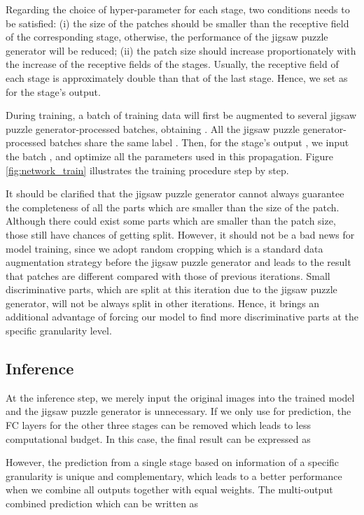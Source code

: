 \documentclass{llncs}
\begin{document}
Regarding the choice of hyper-parameter  for each stage, two conditions needs to be satisfied: (i) the size of the patches should be smaller than the receptive field of the corresponding stage, otherwise, the performance of the jigsaw puzzle generator will be reduced; (ii) the patch size should increase proportionately with the increase of the receptive fields of the stages. Usually, the receptive field of each stage is approximately double than that of the last stage. Hence, we set  as  for the  stage's output. 


During training, a batch  of training data will first be augmented to several jigsaw puzzle generator-processed batches, obtaining . All the jigsaw puzzle generator-processed batches share the same label . Then, for the  stage's output , we input the batch , and optimize all the parameters used in this propagation. Figure \ref{fig:network_train} illustrates the training procedure step by step.

It should be clarified that the jigsaw puzzle generator cannot always guarantee the completeness of all the parts which are smaller than the size of the patch. Although there could exist some parts which are smaller than the patch size, those still have chances of getting split. However, it should not be a bad news for model training, since we adopt random cropping which is a standard data augmentation strategy before the jigsaw puzzle generator and leads to the result that patches are different compared with those of previous iterations. Small discriminative parts, which are split at this iteration due to the jigsaw puzzle generator, will not be always split in other iterations. Hence, it brings an additional advantage of forcing our model to find more discriminative parts at the specific granularity level.

\subsection{Inference}

At the inference step, we merely input the original images into the trained model and the jigsaw puzzle generator is unnecessary. If we only use  for prediction, the FC layers for the other three stages can be removed which leads to less computational budget. In this case, the final result  can be expressed as


However, the prediction from a single stage based on information of a specific granularity is unique and complementary, which leads to a better performance when we combine all outputs together with equal weights. The multi-output combined prediction  which can be written as
\end{document}
